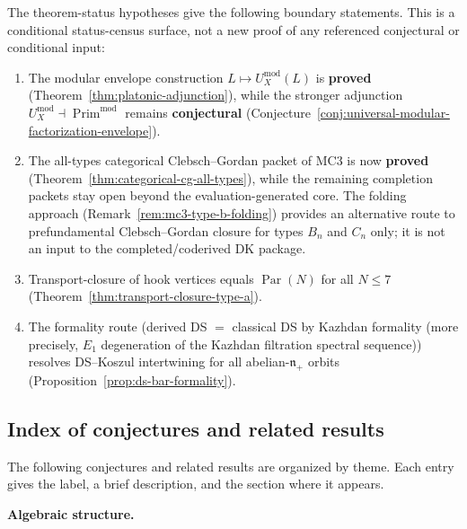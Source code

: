 \begin{remark}
\label{rem:constitution-status-updates}
The theorem-status hypotheses give the following boundary statements.
This is a conditional status-census surface, not a new proof of any
referenced conjectural or conditional input:
\begin{enumerate}[label=\textup{(\roman*)}]
\item The modular envelope construction
 $L \mapsto U^{\mathrm{mod}}_X(L)$ is \textbf{proved}
 \textup{(}Theorem~\ref{thm:platonic-adjunction}\textup{)},
 while the stronger adjunction
 $U^{\mathrm{mod}}_X \dashv \operatorname{Prim}^{\mathrm{mod}}$
 remains \textbf{conjectural}
 \textup{(}Conjecture~\ref{conj:universal-modular-factorization-envelope}\textup{)}.
\item The all-types categorical Clebsch--Gordan packet of MC3 is now
 \textbf{proved}
 (Theorem~\ref{thm:categorical-cg-all-types}),
 while the remaining completion packets stay open beyond the
 evaluation-generated core. The folding approach
 (Remark~\ref{rem:mc3-type-b-folding}) provides an alternative route
 to prefundamental Clebsch--Gordan closure for types $B_n$ and $C_n$
 only; it is not an input to the completed/coderived DK package.
\item Transport-closure of hook vertices equals
 $\operatorname{Par}(N)$ for all $N \leq 7$
 (Theorem~\ref{thm:transport-closure-type-a}).
\item The formality route (derived DS $=$ classical DS by
 Kazhdan formality (more precisely, $E_1$ degeneration of the
 Kazhdan filtration spectral sequence)) resolves DS--Koszul
 intertwining for all abelian-$\mathfrak{n}_+$ orbits
 (Proposition~\ref{prop:ds-bar-formality}).
\end{enumerate}
\end{remark}


\subsection{Index of conjectures and related results}\label{sec:conjecture-index}

The following conjectures and related results are organized by theme.
Each entry gives the label, a brief description,
and the section where it appears.

\smallskip
\noindent\textbf{Algebraic structure.}

